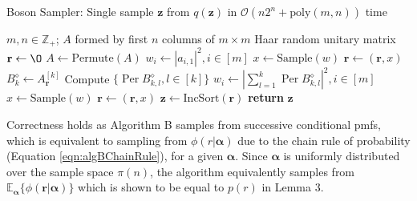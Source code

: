 \documentclass[11pt]{article}
\theoremstyle{theorem}
\theoremstyle{remark}
\theoremstyle{plain}
\theoremstyle{definition}
\DeclareMathOperator*{\Per}{\mathrm{Per}}
\begin{document}
\begin{algorithm}
\caption{Boson Sampler: Single sample $\mathbf{z}$ from $q(\mathbf{z})$ in $\mathcal{O}(n2^n + \text{poly}(m, n))$ time}
\begin{algorithmic}[1]
\Require $m, n \in \mathbb{Z}_+$; $A$ formed by first $n$ columns of $m \times m$ Haar random unitary matrix
\State $\mathbf{r} \leftarrow \O $	
\State $A \leftarrow \text{Permute}(A)$	
\State $w_i \leftarrow \left|a_{i, 1}\right|^2, i \in [m]$	
\State $x \leftarrow \text{Sample}(w)$	
\State $\mathbf{r} \leftarrow (\mathbf{r}, x)$	
\State $B_k^\diamond \leftarrow A_{\mathbf{r}}^{[k]}$
\State Compute  $\{ \Per B_{k, l}^{\diamond}, l \in [k] \}$	
\State $w_i \leftarrow \left| \sum_{l = 1}^k \Per B_{k, l}^{\diamond} \right| ^2, i \in [m] $	
\State $x \leftarrow \text{Sample}(w)$
\State $\mathbf{r} \leftarrow (\mathbf{r}, x)$
\EndFor
\State $\mathbf{z} \leftarrow \text{IncSort}(\mathbf{r})$	
\State \textbf{return} $\mathbf{z}$
\end{algorithmic}
\end{algorithm}

Correctness holds as Algorithm B samples from successive conditional pmfs, which is equivalent to sampling from $\phi (r | \mathbf{\alpha})$ due to the chain rule of probability (Equation \ref{eqn:algBChainRule}), for a given $\mathbf{\alpha}$. Since  $\mathbf{\alpha}$ is uniformly distributed over the sample space $\pi(n)$, the algorithm equivalently samples from $\mathbb{E}_{\mathbf{\alpha}}\{\phi(\mathbf{r} | \mathbf{\alpha})\}$ which is shown to be equal to $p(r)$ in Lemma 3.
\end{document}
